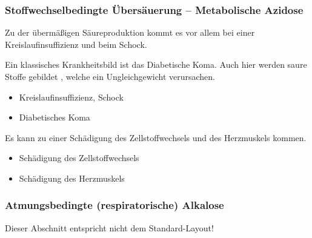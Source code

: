 \subsubsection{Stoffwechselbedingte Übersäuerung
-- Metabolische Azidose} 
\label{topic:azidose-metabolische}



{%
Zu der übermäßigen Säureproduktion kommt es vor allem bei einer
Kreislaufinsuffizienz und beim Schock.

Ein klassisches Krankheitsbild ist das Diabetische Koma. Auch hier werden saure
Stoffe gebildet , welche ein Ungleichgewicht verursachen. 
}{%
\begin{itemize}
    \item Kreislaufinsuffizienz, Schock
    \item Diabetisches Koma
\end{itemize}
}{}{}{}


{%
Es kann zu einer Schädigung des Zellstoffwechsels und des Herzmuskels kommen.
}{%
\begin{itemize}
    \item Schädigung des Zellstoffwechsels
    \item Schädigung des Herzmuskels
\end{itemize}
}{}{}{}




\subsubsection{Atmungsbedingte (respiratorische) Alkalose}
\label{topic:alkalose-respiratorische}

{Dieser Abschnitt entspricht nicht dem Standard-Layout!}


